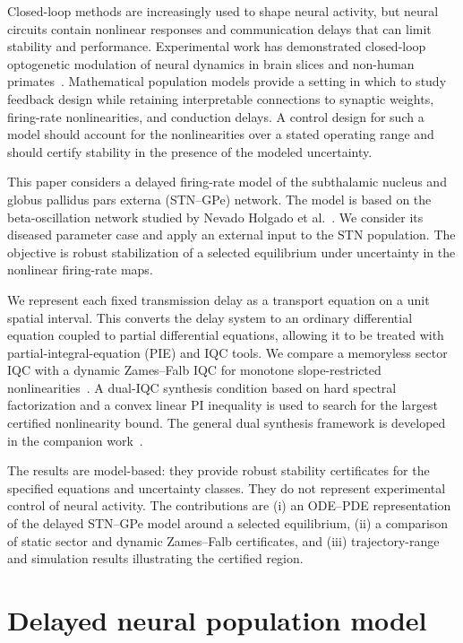 \documentclass[9pt,twocolumn,twoside]{pnas-new}
\begin{document}
Closed-loop methods are increasingly used to shape neural activity, but neural circuits contain nonlinear responses and communication delays that can limit stability and performance. Experimental work has demonstrated closed-loop optogenetic modulation of neural dynamics in brain slices and non-human primates~\cite{zaaimi2023closedloop}. Mathematical population models provide a setting in which to study feedback design while retaining interpretable connections to synaptic weights, firing-rate nonlinearities, and conduction delays. A control design for such a model should account for the nonlinearities over a stated operating range and should certify stability in the presence of the modeled uncertainty.

This paper considers a delayed firing-rate model of the subthalamic nucleus and globus pallidus pars externa (STN--GPe) network. The model is based on the beta-oscillation network studied by Nevado Holgado et al.~\cite{nevadoHolgado2010betaOscillations}. We consider its diseased parameter case and apply an external input to the STN population. The objective is robust stabilization of a selected equilibrium under uncertainty in the nonlinear firing-rate maps.

We represent each fixed transmission delay as a transport equation on a unit spatial interval. This converts the delay system to an ordinary differential equation coupled to partial differential equations, allowing it to be treated with partial-integral-equation (PIE) and IQC tools. We compare a memoryless sector IQC with a dynamic Zames--Falb IQC for monotone slope-restricted nonlinearities~\cite{turner2022zamesfalbmultipliersdontpanic}. A dual-IQC synthesis condition based on hard spectral factorization and a convex linear PI inequality is used to search for the largest certified nonlinearity bound. The general dual synthesis framework is developed in the companion work~\cite{lenssen2026dual}.

The results are model-based: they provide robust stability certificates for the specified equations and uncertainty classes. They do not represent experimental control of neural activity. The contributions are (i) an ODE--PDE representation of the delayed STN--GPe model around a selected equilibrium, (ii) a comparison of static sector and dynamic Zames--Falb certificates, and (iii) trajectory-range and simulation results illustrating the certified region.

\section{Delayed neural population model}
\end{document}
